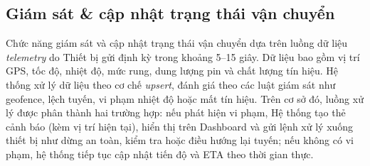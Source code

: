




\subsection{Giám sát \& cập nhật trạng thái vận chuyển}

Chức năng giám sát và cập nhật trạng thái vận chuyển dựa trên luồng dữ liệu \emph{telemetry} do Thiết bị gửi định kỳ trong khoảng 5--15 giây. Dữ liệu bao gồm vị trí GPS, tốc độ, nhiệt độ, mức rung, dung lượng pin và chất lượng tín hiệu. Hệ thống xử lý dữ liệu theo cơ chế \emph{upsert}, đánh giá theo các luật giám sát như geofence, lệch tuyến, vi phạm nhiệt độ hoặc mất tín hiệu. Trên cơ sở đó, luồng xử lý được phân thành hai trường hợp: nếu phát hiện vi phạm, Hệ thống tạo thẻ cảnh báo (kèm vị trí hiện tại), hiển thị trên Dashboard và gửi lệnh xử lý xuống thiết bị như dừng an toàn, kiểm tra hoặc điều hướng lại tuyến; nếu không có vi phạm, hệ thống tiếp tục cập nhật tiến độ và ETA theo thời gian thực.

